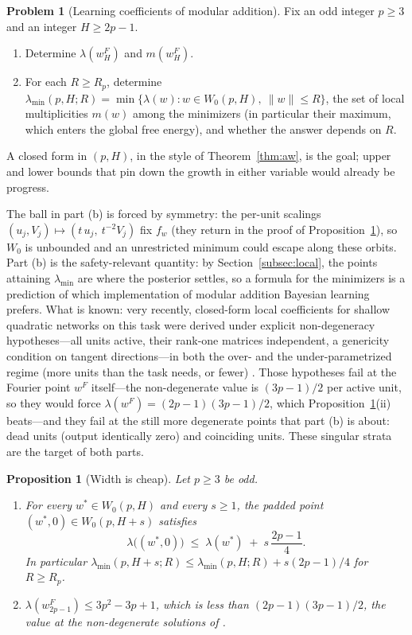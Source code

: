 \documentclass[11pt]{amsart}
\theoremstyle{plain}
\newtheorem{proposition}[theorem]{Proposition}
\theoremstyle{definition}
\newtheorem{problem}[theorem]{Problem}
\begin{document}
\begin{problem}[Learning coefficients of modular addition]\label{prob:modadd}
Fix an odd integer $p \ge 3$ and an integer $H \ge 2p - 1$.
\begin{enumerate}
\item[(a)] Determine $\lambda(w^F_H)$ and $m(w^F_H)$.
\item[(b)] For each $R \ge R_p$, determine
$\lambda_{\min}(p, H; R) = \min \{\lambda(w) : w \in W_0(p,H),\ \|w\| \le R\}$,
the set of local multiplicities $m(w)$ among the minimizers (in particular their maximum, which enters the global free energy), and whether the answer depends on $R$.
\end{enumerate}
A closed form in $(p, H)$, in the style of Theorem~\ref{thm:aw}, is the goal; upper and lower bounds that pin down the growth in either variable would already be progress.
\end{problem}

The ball in part (b) is forced by symmetry: the per-unit scalings $(u_j, V_j) \mapsto (t\,u_j,\ t^{-2}V_j)$ fix $f_w$ (they return in the proof of Proposition~\ref{prop:width}), so $W_0$ is unbounded and an unrestricted minimum could escape along these orbits. Part (b) is the safety-relevant quantity: by Section~\ref{subsec:local}, the points attaining $\lambda_{\min}$ are where the posterior settles, so a formula for the minimizers is a prediction of which implementation of modular addition Bayesian learning prefers. What is known: very recently, closed-form local coefficients for shallow quadratic networks on this task were derived under explicit non-degeneracy hypotheses---all units active, their rank-one matrices independent, a genericity condition on tangent directions---in both the over- and the under-parametrized regime (more units than the task needs, or fewer) \cite{cullen2026}. Those hypotheses fail at the Fourier point $w^F$ itself---the non-degenerate value is $(3p-1)/2$ per active unit, so they would force $\lambda(w^F) = (2p-1)(3p-1)/2$, which Proposition~\ref{prop:width}(ii) beats---and they fail at the still more degenerate points that part (b) is about: dead units (output identically zero) and coinciding units. These singular strata are the target of both parts.

\begin{proposition}[Width is cheap]\label{prop:width}
Let $p \ge 3$ be odd.
\begin{enumerate}
\item[(i)] For every $w^* \in W_0(p, H)$ and every $s \ge 1$, the padded point $(w^*, 0) \in W_0(p, H+s)$ satisfies
\[
   \lambda\bigl((w^*, 0)\bigr) \;\le\; \lambda(w^*) \;+\; s\,\frac{2p-1}{4}.
\]
In particular $\lambda_{\min}(p, H+s; R) \le \lambda_{\min}(p, H; R) + s(2p-1)/4$ for $R \ge R_p$.
\item[(ii)] $\lambda(w^F_{2p-1}) \le 3p^2 - 3p + 1$, which is less than $(2p-1)(3p-1)/2$, the value at the non-degenerate solutions of \cite{cullen2026}.
\end{enumerate}
\end{proposition}
\end{document}
